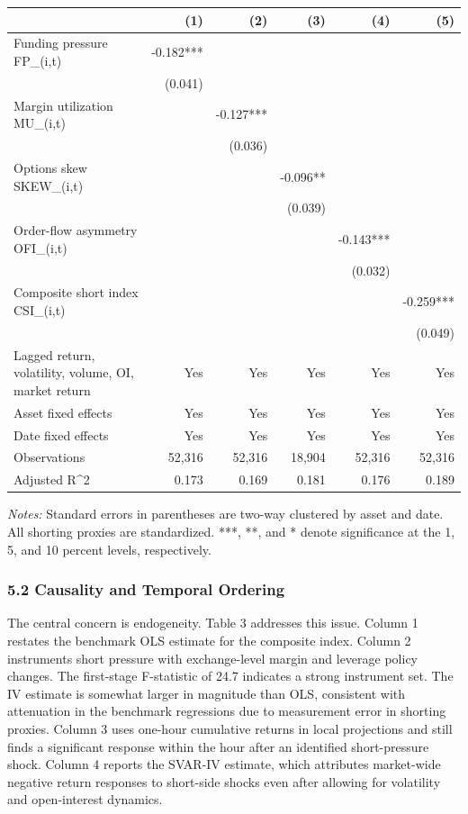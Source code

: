 \documentclass[
]{article}
\newcounter{none} %
\begin{document}
{\def\LTcaptype{none} %
\begin{longtable}[]{@{}lrrrrr@{}}
\toprule\noalign{}
& (1) & (2) & (3) & (4) & (5) \\
\midrule\noalign{}
\endhead
\bottomrule\noalign{}
\endlastfoot
Funding pressure FP\_(i,t) & -0.182*** & & & & \\
& (0.041) & & & & \\
Margin utilization MU\_(i,t) & & -0.127*** & & & \\
& & (0.036) & & & \\
Options skew SKEW\_(i,t) & & & -0.096** & & \\
& & & (0.039) & & \\
Order-flow asymmetry OFI\_(i,t) & & & & -0.143*** & \\
& & & & (0.032) & \\
Composite short index CSI\_(i,t) & & & & & -0.259*** \\
& & & & & (0.049) \\
Lagged return, volatility, volume, OI, market return & Yes & Yes & Yes &
Yes & Yes \\
Asset fixed effects & Yes & Yes & Yes & Yes & Yes \\
Date fixed effects & Yes & Yes & Yes & Yes & Yes \\
Observations & 52,316 & 52,316 & 18,904 & 52,316 & 52,316 \\
Adjusted R\^{}2 & 0.173 & 0.169 & 0.181 & 0.176 & 0.189 \\
\end{longtable}
}

\emph{Notes:} Standard errors in parentheses are two-way clustered by
asset and date. All shorting proxies are standardized. ***, **, and *
denote significance at the 1, 5, and 10 percent levels, respectively.

\subsubsection{5.2 Causality and Temporal
Ordering}\label{52-causality-and-temporal-ordering}

The central concern is endogeneity. Table 3 addresses this issue. Column
1 restates the benchmark OLS estimate for the composite index. Column 2
instruments short pressure with exchange-level margin and leverage
policy changes. The first-stage F-statistic of 24.7 indicates a strong
instrument set. The IV estimate is somewhat larger in magnitude than
OLS, consistent with attenuation in the benchmark regressions due to
measurement error in shorting proxies. Column 3 uses one-hour cumulative
returns in local projections and still finds a significant response
within the hour after an identified short-pressure shock. Column 4
reports the SVAR-IV estimate, which attributes market-wide negative
return responses to short-side shocks even after allowing for volatility
and open-interest dynamics.
\end{document}
